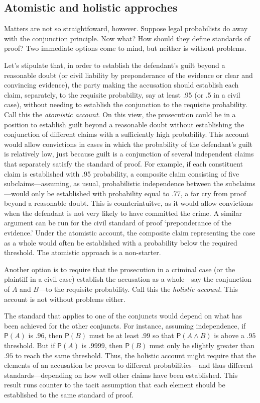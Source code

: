 \documentclass[
  10pt,
  dvipsnames,enabledeprecatedfontcommands]{scrartcl}
\newcommand{\raf}[1]{\todo[color=olive!40]{#1}}
\newcommand{\et}{\wedge}
\newcommand{\pr}[1]{\ensuremath{\mathsf{P}(#1)}}
\begin{document}
\hypertarget{atomistic-and-holistic-approches}{%
\subsection{Atomistic and holistic
approches}\label{atomistic-and-holistic-approches}}

Matters are not so straightfoward, however. Suppose legal probabilists
do away with the conjunction principle. Now what? How should they define
standards of proof? Two immediate options come to mind, but neither is
without problems.

Let's stipulate that, in order to establish the defendant's guilt beyond
a reasonable doubt (or civil liability by preponderance of the evidence
or clear and convincing evidence), the party making the accusation
should establish each claim, separately, to the requisite probability,
say at least .95 (or .5 in a civil case), without needing to establish
the conjunction to the requisite probability. Call this the
\textit{atomistic account}. On this view, the prosecution could be in a
position to establish guilt beyond a reasonable doubt without
establishing the conjunction of different claims with a sufficiently
high probability. This account would allow convictions in cases in which
the probability of the defendant's guilt is relatively low, just because
guilt is a conjunction of several independent claims that separately
satisfy the standard of proof. For example, if each constituent claim is
established with .95 probability, a composite claim consisting of five
subclaims---assuming, as usual, probabilistic independence between the
subclaims---would only be established with probability equal to .77, a
far cry from proof beyond a reasonable doubt. This is counterintuitve,
as it would allow convictions when the defendant is not very likely to
have committed the crime. A similar argument can be run for the civil
standard of proof `preponderance of the evidence.' Under the atomistic
account, the composite claim representing the case as a whole would
often be established with a probability below the required threshold.
The atomistic approach is a non-starter.

Another option is to require that the prosecution in a criminal case (or
the plaintiff in a civil case) establish the accusation as a whole---say
the conjunction of \(A\) and \(B\)---to the requisite probability. Call
this the \textit{holistic account}. This account is not without problems
either.

The standard that applies to one of the conjuncts would depend on what
has been achieved for the other conjuncts. For instance, assuming
independence, if \(\pr{A}\) is \(.96\), then \(\pr{B}\) must be at least
\(.99\) so that \(\pr{A\et B}\) is above a \(.95\) threshold. But if
\(\pr{A}\) is \(.9999\), then \(\pr{B}\) must only be slightly greater
than \(.95\) to reach the same threshold. Thus, the holistic account
might require that the elements of an accusation be proven to different
probabilities---and thus different standards---depending on how well
other claims have been established. This result runs counter to the
tacit assumption that each element should be established to the same
standard of proof. \raf{M: Cite Ubaniak's paper on this point.}
\end{document}
